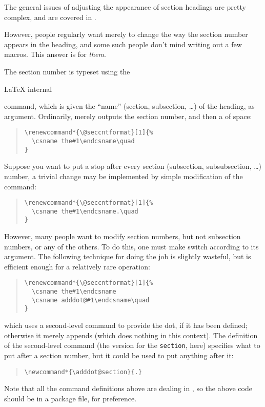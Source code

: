 
The general issues of adjusting the appearance of section headings are
pretty complex, and are covered in %
.

However, people regularly want merely to change the way the section
number appears in the heading, and some such people don't mind writing
out a few macros.  This answer is for \emph{them}.

The section number is typeset using the
\begin{dviversion}
  \LaTeX{} internal
\end{dviversion}
\begin{hyperversion}
\end{hyperversion}
 command, which is given the ``name'' (section,
subsection, \dots{}) of the heading, as argument.  Ordinarily,
merely outputs the section number, and then a  of space:
\begin{quote}
\begin{verbatim}
\renewcommand*{\@seccntformat}[1]{%
  \csname the#1\endcsname\quad
}
\end{verbatim}
\end{quote}
Suppose you want to put a stop after every section (subsection,
subsubsection, \dots{}) number, a trivial change may be implemented by
simple modification of the command:
\begin{quote}
\begin{verbatim}
\renewcommand*{\@seccntformat}[1]{%
  \csname the#1\endcsname.\quad
}
\end{verbatim}
\end{quote}
However, many people want to modify section numbers, but not
subsection numbers, or any of the others.  To do this, one must make
 switch according to its argument.  The following
technique for doing the job is slightly wasteful, but is efficient
enough for a relatively rare operation:
\begin{quote}
\begin{verbatim}
\renewcommand*{\@seccntformat}[1]{%
  \csname the#1\endcsname
  \csname adddot@#1\endcsname\quad
}
\end{verbatim}
\end{quote}
which uses a second-level command to provide the dot, if it has been
defined; otherwise it merely appends  (which does nothing
in this context).  The definition of the second-level command (the
version for the \texttt{section}, here) specifies what to put after a
section number, but it could be used to put anything after it:
\begin{quote}
\begin{verbatim}
\newcommand*{\adddot@section}{.}
\end{verbatim}
\end{quote}
Note that all the command definitions above are dealing in
, so the above
code should be in a package file, for preference.


